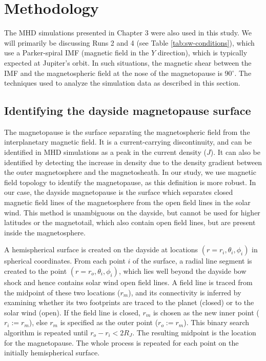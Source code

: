 \section{Methodology}
The MHD simulations presented in Chapter 3 were also used in this study. We will primarily be discussing Runs 2 and 4 (see Table \ref{tab:sw-conditions}), which use a Parker-spiral IMF (magnetic field in the $Y$ direction), which is typically expected at Jupiter's orbit. In such situations, the magnetic shear between the IMF and the magnetospheric field at the nose of the magnetopause is 90$^\circ$. The techniques used to analyze the simulation data as described in this section.

\subsection{Identifying the dayside magnetopause surface}
The magnetopause is the surface separating the magnetospheric field from the interplanetary magnetic field. It is a current-carrying discontinuity, and can be identified in MHD simulations as a peak in the current density ($J$). It can also be identified by detecting the increase in density due to the density gradient between the outer magnetosphere and the magnetosheath. In our study, we use magnetic field topology to identify the magnetopause, as this definition is more robust. In our case, the dayside magnetopause is the surface which separates closed magnetic field lines of the magnetosphere from the open field lines in the solar wind. This method is unambiguous on the dayside, but cannot be used for higher latitudes or the magnetotail, which also contain open field lines, but are present inside the magnetosphere. 

A hemispherical surface is created on the dayside at locations $(r=r_i, \theta_i, \phi_i)$ in spherical coordinates. From each point $i$ of the surface, a radial line segment is created to the point $(r=r_o, \theta_i, \phi_i)$, which lies well beyond the dayside bow shock and hence contains solar wind open field lines. A field line is traced from the midpoint of these two locations ($r_m$), and its connectivity is inferred by examining whether its two footprints are traced to the planet (closed) or to the solar wind (open). If the field line is closed, $r_m$ is chosen as the new inner point ($r_i:=r_m$), else $r_m$ is specified as the outer point ($r_o:=r_m$). This binary search algorithm is repeated until $r_o - r_i < 2 R_J$. The resulting midpoint is the location for the magnetopause. The whole process is repeated for each point on the initially hemispherical surface. 

